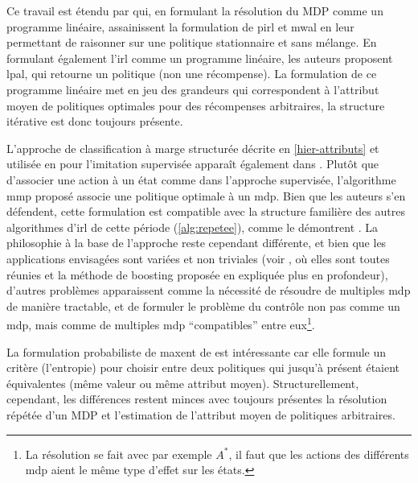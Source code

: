 \documentclass[frenchb,a4paper,justified,notoc]{tufte-book}
\begin{document}
   Ce travail est étendu par \citet{syed2008apprenticeship} qui, en formulant la résolution du MDP comme un programme linéaire, assainissent la formulation de \gls{pirl} et \gls{mwal} en leur permettant de raisonner sur une politique stationnaire et sans mélange. En formulant également l'\gls{irl} comme un programme linéaire, les auteurs proposent \gls{lpal}, qui retourne un politique (non une récompense). La formulation de ce programme linéaire met en jeu des grandeurs qui correspondent à l'attribut moyen de politiques optimales pour des récompenses arbitraires, la structure itérative est donc toujours présente.

   L'approche de classification à marge structurée décrite en \autoref{hier-attributs} et utilisée en \citep{ratliff2007imitation} pour l'imitation supervisée apparaît également dans \citep{ratliff2006maximum}. Plutôt que d'associer une action à un état comme dans l'approche supervisée, l'algorithme \gls{mmp} proposé associe une politique optimale à un \gls{mdp}. Bien que les auteurs s'en défendent, cette formulation est compatible avec la structure familière des autres algorithmes d'\gls{irl} de cette période (\autoref{alg:repetee}), comme le démontrent \citet{neu2009training}. La philosophie à la base de l'approche reste cependant différente, et bien que les applications envisagées sont variées et non triviales (voir \citep{ratliff2009learning}, où elles sont toutes réunies et la méthode de boosting proposée en \citep{ratliff2007boosting} expliquée plus en profondeur), d'autres problèmes apparaissent comme la nécessité de résoudre de multiples \gls{mdp} de manière tractable, et de formuler le problème du contrôle non pas comme un \gls{mdp}, mais comme de multiples \gls{mdp} ``compatibles'' entre eux\footnote{La résolution se fait avec par exemple $A^*$, il faut que les actions des différents \gls{mdp} aient le même type d'effet sur les états.
 }.

   La formulation probabiliste de \gls{maxent} de \citet{ziebart2008maximum} est intéressante car elle formule un critère (l'entropie) pour choisir entre deux politiques qui jusqu'à présent étaient équivalentes (même valeur ou même attribut moyen). Structurellement, cependant, les différences restent minces avec toujours présentes la résolution répétée d'un MDP et l'estimation de l'attribut moyen de politiques arbitraires.
\end{document}
